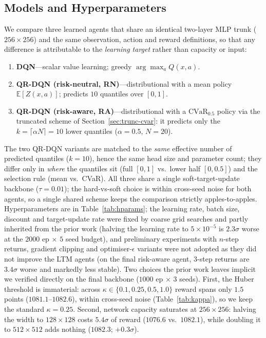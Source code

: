 \documentclass[conference]{IEEEtran}
\begin{document}
\subsection{Models and Hyperparameters}
We compare three learned agents that share an identical two-layer MLP trunk
($256\times256$) and the same observation, action and reward definitions, so
that any difference is attributable to the \emph{learning target} rather than
capacity or input:
\begin{enumerate}
  \item \textbf{DQN}---scalar value learning; greedy $\arg\max_a Q(x,a)$.
  \item \textbf{QR-DQN (risk-neutral, RN)}---distributional with a mean policy
  $\mathbb{E}[Z(x,a)]$; predicts $10$ quantiles over $[0,1]$.
  \item \textbf{QR-DQN (risk-aware, RA)}---distributional with a
  $\mathrm{CVaR}_{0.5}$ policy via the truncated scheme of
  Section~\ref{sec:trunc-cvar}: it predicts only the $k=\lceil\alpha N\rceil=10$
  lower quantiles ($\alpha=0.5$, $N=20$).
\end{enumerate}
The two QR-DQN variants are matched to the \emph{same} effective number of
predicted quantiles ($k=10$), hence the same head size and parameter count;
they differ only in \emph{where} the quantiles sit (full $[0,1]$ vs.\ lower
half $[0,0.5]$) and the selection rule (mean vs.\ CVaR). All three share a
single soft-target-update backbone ($\tau=0.01$); the hard-vs-soft choice is
within cross-seed noise for both agents, so a single shared scheme keeps the
comparison strictly apples-to-apples. Hyperparameters are in
Table~\ref{tab:hparams}; the learning rate, batch size, discount and
target-update rate were fixed by coarse grid searches and partly inherited from
the prior work (halving the learning rate to $5{\times}10^{-5}$ is $2.3\sigma$
worse at the $2000$ ep $\times$ $5$ seed budget), and preliminary experiments
with $n$-step returns, gradient
clipping and optimiser-$\epsilon$ variants were not adopted as they did not
improve the LTM agents (on the final risk-aware agent, $3$-step returns are
$3.4\sigma$ worse and markedly less stable). Two choices the prior work leaves
implicit we verified directly on the final backbone ($1000$ ep $\times$ $3$
seeds). First, the Huber threshold is immaterial: across
$\kappa\in\{0.1,0.25,0.5,1.0\}$ reward spans only $1.5$ points
($1081.1$--$1082.6$), within cross-seed noise (Table~\ref{tab:kappa}), so we
keep the standard $\kappa{=}0.25$. Second,
network capacity saturates at $256{\times}256$: halving the width to
$128{\times}128$ costs $5.4\sigma$ of reward ($1076.6$ vs.\ $1082.1$), while
doubling it to $512{\times}512$ adds nothing ($1082.3$; $+0.3\sigma$).
\end{document}

